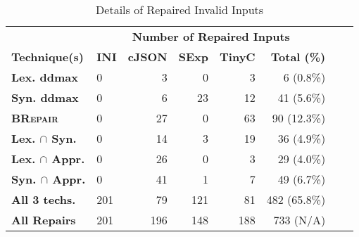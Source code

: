 \documentclass[sigconf,review,anonymous]{acmart}
\newcommand{\approach}{\textsc{BRepair}\xspace}
\begin{document}
\begin{table}[!tbp]\centering
\caption{Details of Repaired Invalid %
Inputs}
\begin{tabular}{|l | l | r | r | r | r | r | l |}
\hline
&  \multicolumn{5}{c|}{\textbf{Number of Repaired Inputs}}  \\
\textbf{Technique(s)} & \textbf{INI} & \textbf{cJSON} & \textbf{SExp} & \textbf{TinyC} & \textbf{Total (\%)} \\
\hline
\textbf{Lex. ddmax } & 0 & 3 & 0 & 3 & 6  (0.8\%) \\
\textbf{Syn. ddmax } & 0 & 6 & 23 & 12 & 41  (5.6\%)  \\
\textbf{\approach } & 0 & 27 & 0 & 63 & 90 (12.3\%)  \\
\hline
\textbf{Lex. $\cap$ Syn.} & 0 & 14 & 3 & 19 & 36  (4.9\%) \\
\textbf{Lex. $\cap$ Appr.} & 0 & 26 & 0 & 3 & 29  (4.0\%) \\
\textbf{Syn. $\cap$ Appr.} & 0 & 41 & 1 & 7 & 49  (6.7\%) \\
\hline
\textbf{All 3 techs.}
& 201 & 79 & 121 & 81 & 482  (65.8\%)\\
\hline
\textbf{All Repairs} & 201 & 196 & 148 & 188 &  733  (N/A)\\
\hline
\end{tabular}
\label{tab:repair-complementarity}
\end{table}
\end{document}
